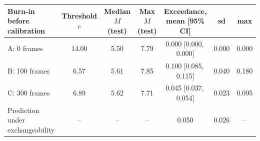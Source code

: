 \begin{tabular}{lcccccc}\toprule
Burn-in before calibration & Threshold $c$ & Median $M$ (test) & Max $M$ (test) & Exceedance, mean [95\% CI] & sd & max \\\midrule
A: 0 frames & 14.00 & 5.50 & 7.79 & 0.000 [0.000,\,0.000] & 0.000 & 0.000 \\
B: 100 frames & 6.57 & 5.61 & 7.85 & 0.100 [0.085,\,0.115] & 0.040 & 0.180 \\
C: 300 frames & 6.89 & 5.62 & 7.71 & 0.045 [0.037,\,0.054] & 0.023 & 0.095 \\
Prediction under exchangeability & -- & -- & -- & 0.050 & 0.026 & -- \\
\bottomrule\end{tabular}
